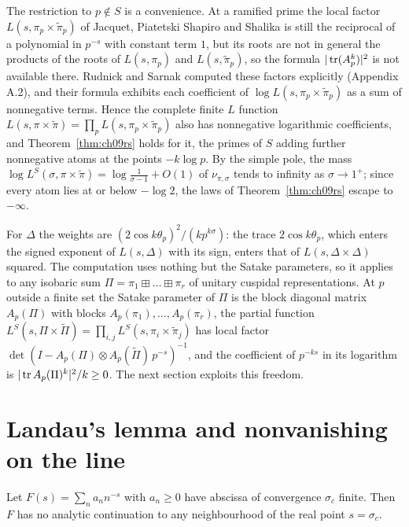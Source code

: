 The restriction to $p\notin S$ is a convenience. At a ramified prime the local factor $L(s,\pi_p\times\tilde\pi_p)$ of Jacquet, Piatetski Shapiro and Shalika is still the reciprocal of a polynomial in $p^{-s}$ with constant term $1$, but its roots are not in general the products of the roots of $L(s,\pi_p)$ and $L(s,\tilde\pi_p)$, so the formula $|\operatorname{tr}(A_p^k)|^2$ is not available there. Rudnick and Sarnak computed these factors explicitly \cite{rudnicksarnak1996} (Appendix A.2), and their formula exhibits each coefficient of $\log L(s,\pi_p\times\tilde\pi_p)$ as a sum of nonnegative terms. Hence the complete finite $L$ function $L(s,\pi\times\tilde\pi) = \prod_pL(s,\pi_p\times\tilde\pi_p)$ also has nonnegative logarithmic coefficients, and Theorem~\ref{thm:ch09rs} holds for it, the primes of $S$ adding further nonnegative atoms at the points $-k\log p$. By the simple pole, the mass $\log L^S(\sigma,\pi\times\tilde\pi) = \log\frac1{\sigma-1}+O(1)$ of $\nu_{\pi,\sigma}$ tends to infinity as $\sigma\to1^+$; since every atom lies at or below $-\log2$, the laws of Theorem~\ref{thm:ch09rs} escape to $-\infty$.

For $\Delta$ the weights are $(2\cos k\theta_p)^2/(k p^{k\sigma})$: the trace $2\cos k\theta_p$, which enters the signed exponent of $L(s,\Delta)$ with its sign, enters that of $L(s,\Delta\times\Delta)$ squared. The computation uses nothing but the Satake parameters, so it applies to any isobaric sum $\Pi = \pi_1\boxplus\dots\boxplus\pi_r$ of unitary cuspidal representations. At $p$ outside a finite set the Satake parameter of $\Pi$ is the block diagonal matrix $A_p(\Pi)$ with blocks $A_p(\pi_1),\dots,A_p(\pi_r)$, the partial function $L^S(s,\Pi\times\tilde\Pi) = \prod_{i,j}L^S(s,\pi_i\times\tilde\pi_j)$ has local factor $\det(I-A_p(\Pi)\otimes A_p(\tilde\Pi)\,p^{-s})^{-1}$, and the coefficient of $p^{-ks}$ in its logarithm is $|\operatorname{tr} A_p(\Pi)^k|^2/k\ge0$. The next section exploits this freedom.

\section{Landau's lemma and nonvanishing on the line}

\begin{lemma}[Landau]\label{lem:ch09landau}
Let $F(s) = \sum_n a_n n^{-s}$ with $a_n\ge 0$ have abscissa of convergence $\sigma_c$ finite. Then $F$ has no analytic continuation to any neighbourhood of the real point $s=\sigma_c$.
\end{lemma}


